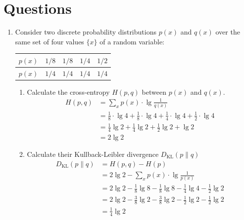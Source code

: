 \documentclass[10pt,\jkfside,a4paper]{article}
\begin{document}
\section*{Questions}

\begin{enumerate}

    \item Consider two discrete probability distributions $p(x)$ and $q(x)$ over the same set of four values $\{x\}$ of a random variable:

    \begin{table}[H]

        \centering

        \begin{tabular}{c||c|c|c|c}
        $p(x)$ & $1/8$ & $1/8$ & $1/4$ & $1/2$ \\
        \hline
        $p(x)$ & $1/4$ & $1/4$ & $1/4$ & $1/4$ \\
        \end{tabular}

    \end{table}

    \begin{enumerate}

        \item Calculate the cross-entropy $H(p, q)$ between $p(x)$ and $q(x)$.
        \begin{align*}
            H(p, q)
            &= \sum_x p(x) \cdot \lg \frac1{q(x)} \\
            &= \frac18 \cdot \lg 4 + \frac18 \cdot \lg 4 + \frac14 \cdot \lg 4 + \frac12 \cdot \lg 4 \\
            &= \frac14 \lg 2 + \frac14 \lg 2 + \frac12 \lg 2 + \lg 2 \\
            &= 2\lg 2
        \end{align*}

        \item Calculate their Kullback-Leibler divergence $D_{\mathrm{KL}}(p \parallel q)$
        \begin{align*}
            D_{\mathrm{KL}}(p \parallel q)
            &= H(p, q) - H(p) \\
            &= 2\lg 2 - \sum_x p(x) \cdot \lg \frac{1}{p(x)} \\
            &= 2\lg 2 - \frac18 \lg 8 - \frac18 \lg 8 - \frac14 \lg 4 - \frac12 \lg 2 \\
            &= 2\lg 2 - \frac38 \lg 2 - \frac38 \lg 2 - \frac12 \lg 2 - \frac12 \lg 2 \\
            &= \frac14 \lg 2
        \end{align*}


\end{enumerate}
\end{enumerate}
\end{document}
